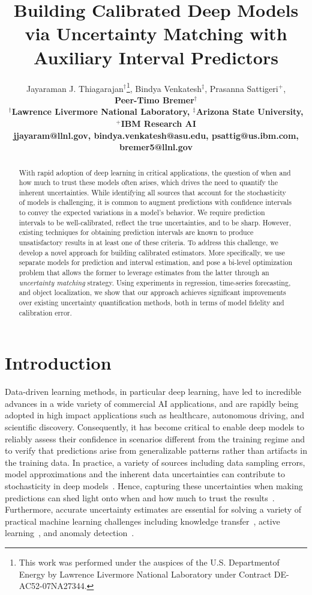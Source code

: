 \documentclass[letterpaper]{article} %
\title{Building Calibrated Deep Models via Uncertainty Matching with Auxiliary Interval Predictors}
\author{Jayaraman J. Thiagarajan$^{\dagger}$\thanks{This  work  was  performed  under  the  auspices  of  the  U.S.  Departmentof Energy by Lawrence Livermore National Laboratory under Contract DE-AC52-07NA27344.}, Bindya Venkatesh$^{\ddagger}$, Prasanna Sattigeri$^{+}$, \\ \Large \bf Peer-Timo Bremer$^{\dagger}$
\\
$^{\dagger}$Lawrence Livermore National Laboratory, $^{\ddagger}$Arizona State University, $^{+}$IBM Research AI
\\
jjayaram@llnl.gov, bindya.venkatesh@asu.edu, psattig@us.ibm.com, bremer5@llnl.gov
}
\begin{document}
\maketitle

\begin{abstract}
With rapid adoption of deep learning in critical applications, the question of when and how much to trust these models often arises, which drives the need to quantify the inherent uncertainties. While identifying all sources that account for the stochasticity of models is challenging, it is common to augment predictions with confidence intervals to convey the expected variations in a model's behavior. We require prediction intervals to be well-calibrated, reflect the true uncertainties, and to be sharp. However, existing techniques for obtaining prediction intervals are known to produce unsatisfactory results in at least one of these criteria. To address this challenge, we develop a novel approach for building calibrated estimators. More specifically, we use separate models for prediction and interval estimation, and pose a bi-level optimization problem that allows the former to leverage estimates from the latter through an \textit{uncertainty matching} strategy. Using experiments in regression, time-series forecasting, and object localization, we show that our approach achieves significant improvements over existing uncertainty quantification methods, both in terms of model fidelity and calibration error.
\end{abstract}

\section{Introduction}
Data-driven learning methods, in particular deep learning, have led to incredible advances in a wide variety of commercial AI applications, and are rapidly being adopted in high impact applications such as healthcare, autonomous driving, and scientific discovery. Consequently, it has become critical to enable deep models to reliably assess their confidence in scenarios different from the training regime and to verify that predictions arise from generalizable patterns rather than artifacts in the training data. In practice, a variety of sources including data sampling errors, model approximations and the inherent data uncertainties can contribute to stochasticity in deep models~\cite{gal2016uncertainty}. Hence, capturing these uncertainties when making predictions can shed light onto when and how much to trust the results~\cite{healthuqleveraging,uqbioopportunities,cvuncertainties,levasseur2017uncertaintiesphysics}. Furthermore, accurate uncertainty estimates are essential for solving a variety of practical machine learning challenges including knowledge transfer~\cite{wen2019bayesian}, active learning~\cite{wang2016cost}, and anomaly detection~\cite{leibig2017leveraging}.
\end{document}
